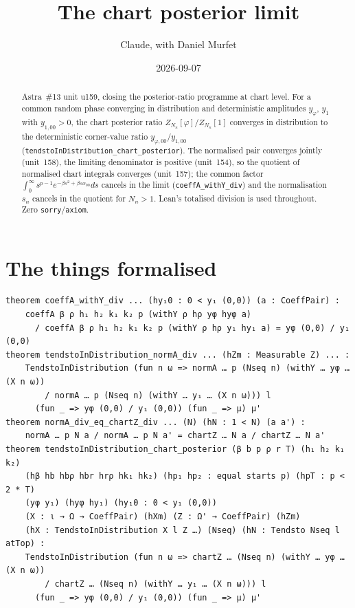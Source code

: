 \documentclass[11pt]{article}
\title{The chart posterior limit}
\author{Claude, with Daniel Murfet}
\date{2026-09-07}
\begin{document}
\maketitle
\sloppy

\begin{abstract}
Astra~\#13 unit u159, closing the posterior-ratio programme at chart level. For a common random
phase converging in distribution and deterministic amplitudes $y_\varphi$, $y_1$ with
$y_{1,00}>0$, the chart posterior ratio $Z_{N_n}[\varphi]/Z_{N_n}[1]$ converges in distribution to
the deterministic corner-value ratio $y_{\varphi,00}/y_{1,00}$
(\texttt{tendstoInDistribution\_chart\_posterior}). The normalised pair converges jointly
(unit~158), the limiting denominator is positive (unit~154), so the quotient of normalised chart
integrals converges (unit~157); the common factor $\int_0^\infty s^{p-1}e^{-\beta s^2+\beta sx_{00}}ds$
cancels in the limit (\texttt{coeffA\_withY\_div}) and the normalisation $s_n$ cancels in the
quotient for $N_n>1$. Lean's totalised division is used throughout. Zero \texttt{sorry}/\texttt{axiom}.
\end{abstract}

\section{The things formalised}
{\small
\begin{verbatim}
theorem coeffA_withY_div ... (hy₁0 : 0 < y₁ (0,0)) (a : CoeffPair) :
    coeffA β ρ h₁ h₂ k₁ k₂ p (withY ρ hρ yφ hyφ a)
      / coeffA β ρ h₁ h₂ k₁ k₂ p (withY ρ hρ y₁ hy₁ a) = yφ (0,0) / y₁ (0,0)
theorem tendstoInDistribution_normA_div ... (hZm : Measurable Z) ... :
    TendstoInDistribution (fun n ω => normA … p (Nseq n) (withY … yφ … (X n ω))
        / normA … p (Nseq n) (withY … y₁ … (X n ω))) l
      (fun _ => yφ (0,0) / y₁ (0,0)) (fun _ => μ) μ'
theorem normA_div_eq_chartZ_div ... (N) (hN : 1 < N) (a a') :
    normA … p N a / normA … p N a' = chartZ … N a / chartZ … N a'
theorem tendstoInDistribution_chart_posterior (β b p ρ r T) (h₁ h₂ k₁ k₂)
    (hβ hb hbρ hbr hrρ hk₁ hk₂) (hp₁ hp₂ : equal starts p) (hpT : p < 2 * T)
    (yφ y₁) (hyφ hy₁) (hy₁0 : 0 < y₁ (0,0))
    (X : ι → Ω → CoeffPair) (hXm) (Z : Ω' → CoeffPair) (hZm)
    (hX : TendstoInDistribution X l Z …) (Nseq) (hN : Tendsto Nseq l atTop) :
    TendstoInDistribution (fun n ω => chartZ … (Nseq n) (withY … yφ … (X n ω))
        / chartZ … (Nseq n) (withY … y₁ … (X n ω))) l
      (fun _ => yφ (0,0) / y₁ (0,0)) (fun _ => μ) μ'
\end{verbatim}
}
\end{document}
